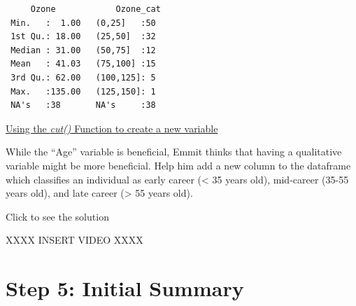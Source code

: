 \documentclass[
  letterpaper,
  DIV=11,
  numbers=noendperiod]{scrreprt}
\newenvironment{Shaded}{\begin{snugshade}}{\end{snugshade}}
\newcommand{\AttributeTok}[1]{\textcolor[rgb]{0.40,0.45,0.13}{#1}}
\newcommand{\DecValTok}[1]{\textcolor[rgb]{0.68,0.00,0.00}{#1}}
\newcommand{\FunctionTok}[1]{\textcolor[rgb]{0.28,0.35,0.67}{#1}}
\newcommand{\NormalTok}[1]{\textcolor[rgb]{0.00,0.23,0.31}{#1}}
\newcommand{\OtherTok}[1]{\textcolor[rgb]{0.00,0.23,0.31}{#1}}
\newcommand{\SpecialCharTok}[1]{\textcolor[rgb]{0.37,0.37,0.37}{#1}}
\begin{document}
\begin{Shaded}
\end{Shaded}

\begin{verbatim}
     Ozone            Ozone_cat 
 Min.   :  1.00   (0,25]   :50  
 1st Qu.: 18.00   (25,50]  :32  
 Median : 31.00   (50,75]  :12  
 Mean   : 41.03   (75,100] :15  
 3rd Qu.: 62.00   (100,125]: 5  
 Max.   :135.00   (125,150]: 1  
 NA's   :38       NA's     :38  
\end{verbatim}

\begin{watch}{}{}
    \href{https://youtu.be/3qMzvNiGmd4}{Using the \textit{cut()} Function to create a new variable}
\end{watch}

\begin{tcolorbox}[enhanced jigsaw, colbacktitle=quarto-callout-tip-color!10!white, breakable, bottomrule=.15mm, colframe=quarto-callout-tip-color-frame, left=2mm, opacitybacktitle=0.6, title=\textcolor{quarto-callout-tip-color}{\faLightbulb}\hspace{0.5em}{Try it Out}, leftrule=.75mm, opacityback=0, rightrule=.15mm, titlerule=0mm, bottomtitle=1mm, colback=white, toprule=.15mm, arc=.35mm, toptitle=1mm, coltitle=black]

While the ``Age'' variable is beneficial, Emmit thinks that having a
qualitative variable might be more beneficial. Help him add a new column
to the dataframe which classifies an individual as early career
(\textless{} 35 years old), mid-career (35-55 years old), and late
career (\textgreater{} 55 years old).

Click to see the solution

XXXX INSERT VIDEO XXXX

\end{tcolorbox}

\section{Step 5: Initial Summary}\label{step-5-initial-summary}
\end{document}
